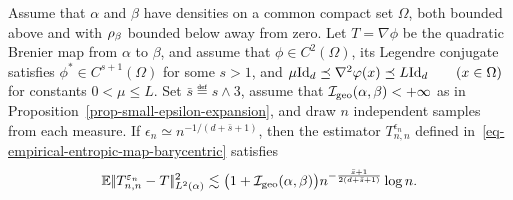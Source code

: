 \begin{prop}\label{prop-entropic-map-rate}
Assume that \(\alpha\) and \(\beta\) have densities on a common compact set \(\Omega\), both bounded above and with \(\rho_{\beta}\) bounded below away from zero. Let \(T=\nabla\phi\) be the quadratic Brenier map from \(\alpha\) to \(\beta\), and assume that \(\phi\in C^2(\Omega)\), its Legendre conjugate satisfies \(\phi^*\in C^{s+1}(\Omega)\) for some \(s>1\), and
\(\mu\mathrm{Id}_d\preceq\nabla^2\varphi(x)\preceq L\mathrm{Id}_d \qquad (x\in\Omega)\)
for constants \(0<\mu\leq L\). Set \(\bar s\eqdef s\wedge3\), assume that \(\mathcal I_{\rm geo}(\alpha,\beta)<+\infty\) as in Proposition~\ref{prop-small-epsilon-expansion}, and draw \(n\) independent samples from each measure. If \(\epsilon_n\simeq n^{-1/(d+\bar s+1)}\), then the estimator \(T_{n,n}^{\epsilon_n}\) defined in~\eqref{eq-empirical-entropic-map-barycentric} satisfies
\[
\mathbb{E}|\!| T_{n,n}^{\varepsilon_n}-T |\!|_{L^2(\alpha)}^2
\lesssim
\bigl(1+\mathcal I_{\rm geo}(\alpha,\beta)\bigr)
n^{-\frac{\bar s+1}{2(d+\bar s+1)}}\log n.
\]
\end{prop}
